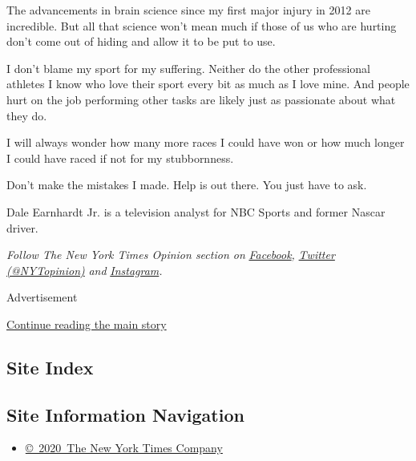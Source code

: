 The advancements in brain science since my first major injury in 2012
are incredible. But all that science won't mean much if those of us who
are hurting don't come out of hiding and allow it to be put to use.

I don't blame my sport for my suffering. Neither do the other
professional athletes I know who love their sport every bit as much as I
love mine. And people hurt on the job performing other tasks are likely
just as passionate about what they do.

I will always wonder how many more races I could have won or how much
longer I could have raced if not for my stubbornness.

Don't make the mistakes I made. Help is out there. You just have to ask.

Dale Earnhardt Jr. is a television analyst for NBC Sports and former
Nascar driver.

\emph{Follow The New York Times Opinion section on}
\href{https://www.facebook.com/nytopinion}{\emph{Facebook}}\emph{,}
\href{http://twitter.com/NYTOpinion}{\emph{Twitter (@NYTopinion)}}
\emph{and}
\href{https://www.instagram.com/nytopinion/}{\emph{Instagram}}\emph{.}

Advertisement

\protect\hyperlink{after-bottom}{Continue reading the main story}

\hypertarget{site-index}{%
\subsection{Site Index}\label{site-index}}

\hypertarget{site-information-navigation}{%
\subsection{Site Information
Navigation}\label{site-information-navigation}}

\begin{itemize}
\tightlist
\item
  \href{https://help.nytimes.com/hc/en-us/articles/115014792127-Copyright-notice}{©~2020~The
  New York Times Company}
\end{itemize}

